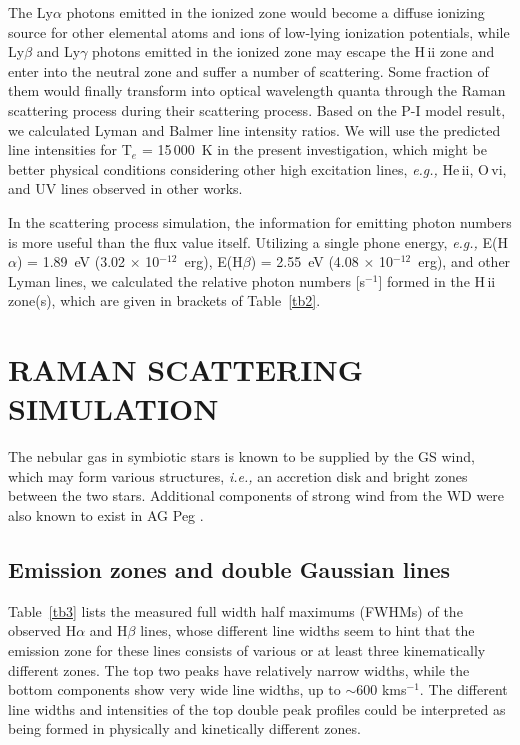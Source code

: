 \documentclass[a4paper,fleqn,usenatbib,useAMS]{mnras}
\def\eg{{\it e.g.,} }
\def\ie{{\it i.e.,} }
\def\ha{H{$\alpha$}}
\def\hb{H{$\beta$}}
\def\hii{H\,{\sc ii}}
\def\heii{He\,{\sc ii}}
\def\ovi{O\,{\sc vi}}
\def\kms{km\hspace{1pt}s$^{-1}$}
\begin{document}
{The Ly$\alpha$ photons emitted in the ionized zone would become a diffuse ionizing source for other elemental atoms and ions of low-lying ionization potentials, while Ly$\beta$ and Ly$\gamma$ photons emitted in the ionized zone may escape the {\hii} zone and enter into the neutral zone and suffer a number of scattering. Some fraction of them would finally transform into optical wavelength quanta through the Raman scattering process during their scattering process. Based on the P-I model result, we calculated Lyman and Balmer line intensity ratios. We will use the predicted line intensities for T$_{e}$ = 15\,000~K in the present investigation, which might be better physical conditions considering other high excitation lines, \eg {\heii},  {\ovi}, and UV lines observed in other works.

In the scattering process simulation, the information for emitting photon numbers is more useful than the flux value itself. Utilizing a single phone energy, \eg E({\ha}) = 1.89~eV (3.02 $\times$ 10$^{-12}$~erg), E({\hb}) = 2.55~eV (4.08 $\times$ 10$^{-12}$~erg), and other Lyman lines, we calculated the relative photon numbers [s$^{-1}$] formed in the {\hii} zone(s), which are given in brackets of Table~\ref{tb2}.

\section{RAMAN SCATTERING SIMULATION}

The nebular gas in symbiotic stars is known to be supplied by the GS wind,
which may form various structures, \ie an accretion disk and bright zones
between the two stars. Additional components of strong wind from the WD were also known to exist in AG Peg \citep{mur95}.

\subsection{Emission zones and double Gaussian lines}

Table~\ref{tb3} lists the measured full width half maximums (FWHMs) of the observed {\ha} and {\hb} lines, whose different line widths seem to hint that the emission zone for these lines consists of various or at least three kinematically different zones. The top two peaks have relatively narrow widths, while the bottom components show very wide line widths, up to $\sim$600 {\kms}. The different line widths and intensities of the top double peak profiles could be interpreted as being formed in physically and kinetically different zones.

}
\end{document}
